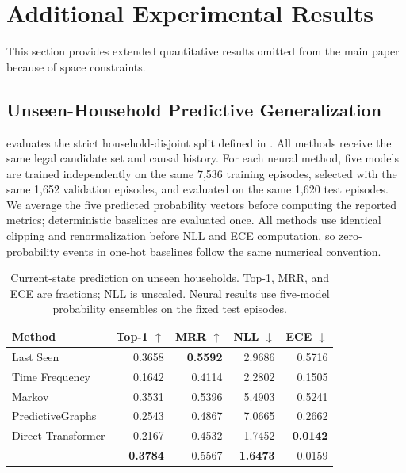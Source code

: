 \section{Additional Experimental Results}
\label{app:experimental-results}

This section provides extended quantitative results omitted from the main paper
because of space constraints.



\subsection{Unseen-Household Predictive Generalization}
\label{app:unseen-households}

 evaluates the strict household-disjoint split
defined in . All methods receive the same legal
candidate set and causal history. For each neural method, five models are
trained independently on the same 7,536 training episodes, selected with the
same 1,652 validation episodes, and evaluated on the same 1,620 test episodes.
We average the five predicted probability vectors before computing the reported
metrics; deterministic baselines are evaluated once. All methods use identical
clipping and renormalization before NLL and ECE computation, so zero-probability
events in one-hot baselines follow the same numerical convention.

\begin{table}[!t]
\caption{Current-state prediction on unseen households. Top-1, MRR, and ECE
are fractions; NLL is unscaled. Neural results use five-model probability
ensembles on the fixed test episodes.}
\label{tab:household-disjoint}
\centering
\scriptsize
\setlength{\tabcolsep}{4pt}
\begin{tabular}{lrrrr}
\toprule
\textbf{Method} & \textbf{Top-1 $\uparrow$} & \textbf{MRR $\uparrow$} &
\textbf{NLL $\downarrow$} & \textbf{ECE $\downarrow$}\\
\midrule
Last Seen & 0.3658 & \textbf{0.5592} & 2.9686 & 0.5716\\
Time Frequency & 0.1642 & 0.4114 & 2.2802 & 0.1505\\
Markov & 0.3531 & 0.5396 & 5.4903 & 0.5241\\
PredictiveGraphs & 0.2543 & 0.4867 & 7.0665 & 0.2662\\
Direct Transformer & 0.2167 & 0.4532 & 1.7452 & \textbf{0.0142}\\
\rowcolor{tblours}\textbf{\evolvingworldnav{}} &
\textbf{0.3784} & 0.5567 & \textbf{1.6473} & 0.0159\\
\bottomrule
\end{tabular}
\end{table}

